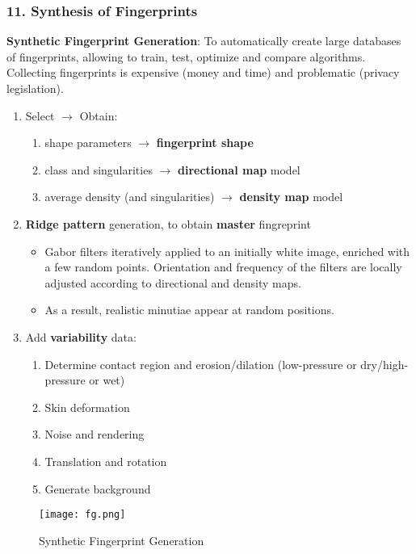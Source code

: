 \documentclass[a4paper]{article}
\begin{document}
    \subsubsection*{11. Synthesis of Fingerprints}
      \textbf{Synthetic Fingerprint Generation}: To automatically create large databases of fingerprints, allowing to train, test, optimize and compare algorithms. Collecting fingerprints is expensive (money and time) and problematic (privacy legislation).
      \begin{enumerate}
        \item Select  $\rightarrow$ Obtain:
        \begin{enumerate}
          \item shape parameters $\rightarrow$ \textbf{fingerprint shape}
          \item class and singularities $\rightarrow$ \textbf{directional map} model
          \item average density (and singularities) $\rightarrow$ \textbf{density map} model
        \end{enumerate}
        \item \textbf{Ridge pattern} generation, to obtain \textbf{master} fingreprint
        \begin{itemize}
          \item Gabor filters iteratively applied to an initially white image, enriched with a few random points. Orientation and frequency of the filters are locally adjusted according to directional and density maps.
          \item As a result, realistic minutiae appear at random positions.
        \end{itemize}
        \item Add \textbf{variability} data:
        \begin{enumerate}
          \item Determine contact region and erosion/dilation (low-pressure or dry/high-pressure or wet)
          \item Skin deformation
          \item Noise and rendering
          \item Translation and rotation
          \item Generate background
        \end{enumerate}
      \end{enumerate}
      \begin{figure}[htp]
        \centering
          \texttt{[image: fg.png]}
          \caption{Synthetic Fingerprint Generation}
          \label{fig:fg}
      \end{figure}
  \newpage
\end{document}
